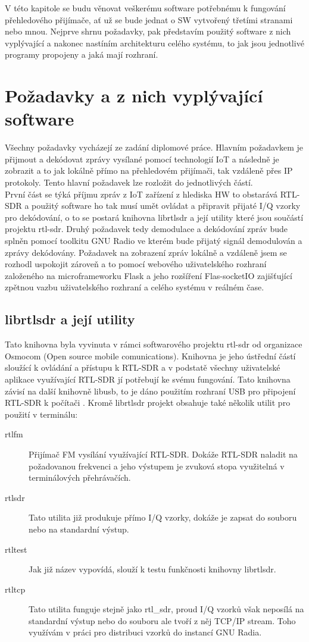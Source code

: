 \documentclass{ctuthesis}
\begin{document}
V této kapitole se budu věnovat veškerému software potřebnému k fungování přehledového přijímače, ať už se bude jednat o SW vytvořený třetími stranami nebo mnou. Nejprve shrnu požadavky, pak představím použitý software z nich vyplývající a nakonec nastíním architekturu celého systému, to jak jsou jednotlivé programy propojeny a jaká mají rozhraní.
\section{Požadavky a z nich vyplývající software}
Všechny požadavky vycházejí ze zadání diplomové práce. Hlavním požadavkem je přijmout a dekódovat zprávy vysílané pomocí technologií IoT a následně je zobrazit a to jak lokálně přímo na přehledovém přijímači, tak vzdáleně přes IP protokoly. Tento hlavní požadavek lze rozložit do jednotlivých částí.\\ 
První část se týká příjmu zpráv z IoT zařízení z hlediska HW to obstarává RTL-SDR a použitý software ho tak musí umět ovládat a připravit přijaté I/Q vzorky pro dekódování, o to se postará knihovna librtlsdr a její utility které jsou součástí projektu rtl-sdr. Druhý požadavek tedy demodulace a dekódování zpráv bude splněn pomocí toolkitu GNU Radio ve kterém bude přijatý signál demodulován a zprávy dekódovány.  Požadavek na zobrazení zpráv lokálně a vzdáleně jsem se rozhodl uspokojit zároveň a to pomocí webového uživatelského rozhraní založeného na microframeworku Flask a jeho rozšíření Flas-socketIO zajišťující zpětnou vazbu uživatelského rozhraní a celého systému v reálném čase.\\

\subsection{librtlsdr a její utility}
Tato knihovna byla vyvinuta v rámci softwarového projektu rtl-sdr od organizace Osmocom (Open source mobile comunications). Knihovna je jeho ústřední částí sloužící k ovládání a přístupu k RTL-SDR a v podstatě všechny uživatelské aplikace využívající RTL-SDR jí potřebují ke svému fungování. Tato knihovna závisí na další knihovně libusb, to je dáno použitím rozhraní USB pro připojení RTL-SDR k počítači \cite{osmocom}. Kromě librtlsdr projekt obsahuje také několik utilit pro použití v terminálu:
\begin{description}
\item[rtl\textunderscore fm]
Přijímač FM vysílání využívající RTL-SDR. Dokáže RTL-SDR naladit na požadovanou frekvenci a jeho výstupem je zvuková stopa využitelná v terminálových přehrávačích.
\item[rtl\textunderscore sdr]
Tato utilita již produkuje přímo I/Q vzorky, dokáže je zapsat do souboru nebo na standardní výstup.
\item[rtl\textunderscore test]
Jak již název vypovídá, slouží k testu funkčnosti knihovny librtlsdr.
\item[rtl\textunderscore tcp]
Tato utilita funguje stejně jako rtl\_sdr, proud I/Q vzorků však neposílá na standardní výstup nebo do souboru ale tvoří z něj TCP/IP stream. Toho využívám v práci pro distribuci vzorků do instancí GNU Radia.
\end{description}
\end{document}
